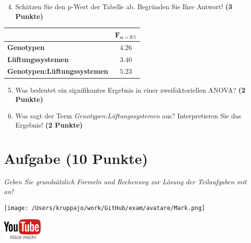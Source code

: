 \documentclass[a4paper, 9pt]{scrartcl}\usepackage[]{graphicx}\usepackage[]{xcolor}
\begin{document}
\vspace{1Ex}

\begin{enumerate}
  \setcounter{enumi}{3}
\item Schätzen Sie den p-Wert der Tabelle ab. Begründen Sie Ihre
  Antwort! \textbf{(3 Punkte)}
\end{enumerate}
  
\begin{center}
    \Large
\begin{tabular}{lc}
  \toprule
     & $\boldsymbol{F_{\alpha = 5\%}}$ \\
\midrule
  \textbf{Genotypen} & $4.26$ \\
  \textbf{Lüftungssystemen} & $3.40$ \\
  \textbf{Genotypen:Lüftungssystemen} & $5.23$ \\
  \bottomrule
  \end{tabular}
\end{center}

\begin{enumerate}
  \setcounter{enumi}{4}
\item Was bedeutet ein signifikantes Ergebnis in einer zweifaktoriellen ANOVA? \textbf{(2 Punkte)}
\item Was sagt der Term \textit{Genotypen:Lüftungssystemen} aus? Interpretieren Sie das Ergebnis! \textbf{(2 Punkte)}
\end{enumerate}
 
\clearpage

\section{Aufgabe \hfill (10 Punkte)}

\textit{Geben Sie grundsätzlich Formeln und Rechenweg zur Lösung der Teilaufgaben mit an!} \\[1Ex]
 

 
\begin{minipage}[t]{0.5\textwidth}
\texttt{[image: /Users/kruppajo/work/GitHub/exam/avatare/Mark.png]}
\end{minipage}
\begin{minipage}[t]{0.5\textwidth}
\hfill
\href{https://youtu.be/rWTyHXXlYjY}{\includegraphics[width = 2cm]{img/youtube}}
\end{minipage}
\vspace{-3Ex}
\end{document}
